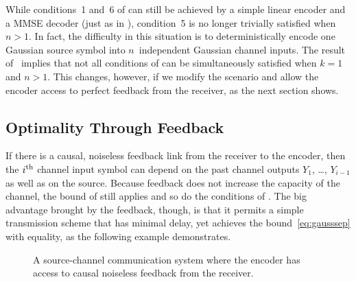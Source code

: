 While conditions~1 and~6 of  can still be achieved
by a simple linear encoder and a MMSE decoder (just as in ),
condition~5 is no longer trivially satisfied when $n > 1$. In fact, the
difficulty in this situation is to deterministically encode one Gaussian source
symbol into $n$~independent Gaussian channel inputs. The result
of~\cite{IngberLZF2008} implies that not all conditions of
 can be simultaneously satisfied when $k = 1$ and
$n > 1$.  This changes, however, if we modify the scenario and allow the encoder
access to perfect feedback from the receiver, as the next section shows.

%


\subsection{Optimality Through Feedback}\label{sec:gaussfeedback}

If there is a causal, noiseless feedback link from the receiver to the encoder,
then the $i{^{\text{th}}}$ channel input symbol can depend on the past channel outputs
$Y_1$, \dots, $Y_{i-1}$ as well as on the source. Because feedback does not
increase the capacity of the channel, the bound of 
still applies and so do the conditions of . The big
advantage brought by the feedback, though, is that it permits a simple
transmission scheme that has minimal delay, yet achieves the
bound~\eqref{eq:gausssep} with equality, as the following example demonstrates.

\begin{figure}
  \begin{center}
    
  \end{center}
  \caption{A source-channel communication system where the encoder has access to
  causal noiseless feedback from the receiver.}
  \label{fig:scgenfeedback}
\end{figure}

